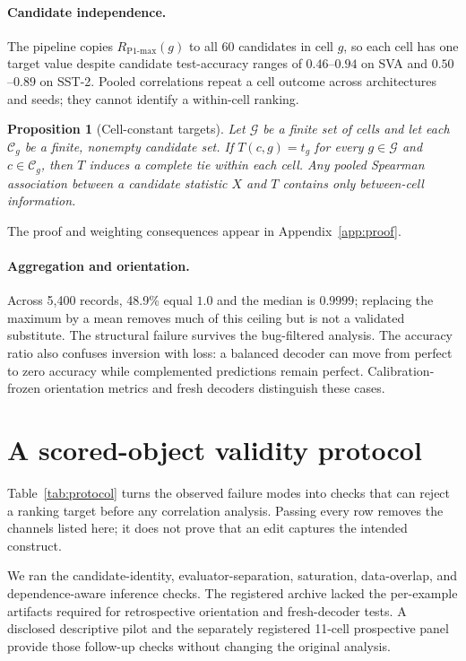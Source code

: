 \documentclass{article}
\newtheorem{proposition}{Proposition}
\newcommand{\RPmax}{R_{\mathrm{P1\text{-}max}}}
\begin{document}
\paragraph{Candidate independence.}
The pipeline copies $\RPmax(g)$ to all 60 candidates in cell $g$, so each cell has one target value despite candidate test-accuracy ranges of $0.46$--$0.94$ on SVA and $0.50$--$0.89$ on SST-2. Pooled correlations repeat a cell outcome across architectures and seeds; they cannot identify a within-cell ranking.

\begin{proposition}[Cell-constant targets]
\label{prop:constant}
Let $\mathcal G$ be a finite set of cells and let each $\mathcal C_g$ be a finite, nonempty candidate set. If $T(c,g)=t_g$ for every $g\in\mathcal G$ and $c\in\mathcal C_g$, then $T$ induces a complete tie within each cell. Any pooled Spearman association between a candidate statistic $X$ and $T$ contains only between-cell information.
\end{proposition}

The proof and weighting consequences appear in Appendix~\ref{app:proof}.

\paragraph{Aggregation and orientation.}
Across 5,400 records, 48.9\% equal $1.0$ and the median is $0.9999$; replacing the maximum by a mean removes much of this ceiling but is not a validated substitute. The structural failure survives the bug-filtered analysis. The accuracy ratio also confuses inversion with loss: a balanced decoder can move from perfect to zero accuracy while complemented predictions remain perfect. Calibration-frozen orientation metrics and fresh decoders distinguish these cases.

\section{A scored-object validity protocol}
\label{sec:protocol}

Table~\ref{tab:protocol} turns the observed failure modes into checks that can reject a ranking target before any correlation analysis. Passing every row removes the channels listed here; it does not prove that an edit captures the intended construct.

We ran the candidate-identity, evaluator-separation, saturation, data-overlap, and dependence-aware inference checks. The registered archive lacked the per-example artifacts required for retrospective orientation and fresh-decoder tests. A disclosed descriptive pilot and the separately registered 11-cell prospective panel provide those follow-up checks without changing the original analysis.
\end{document}
